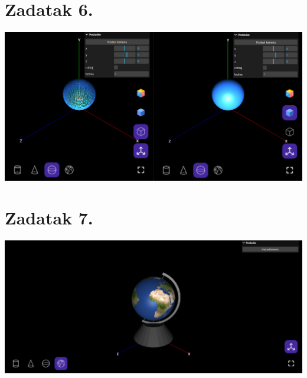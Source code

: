 \documentclass[a4paper,12pt]{article}
\begin{document}
\pagebreak

\section{Zadatak 6.}

\includegraphics[scale=0.5]{image/zadatak6.png}

\pagebreak
\section{Zadatak 7.}

\includegraphics[scale=0.5]{image/zadatak8.png}
\end{document}
